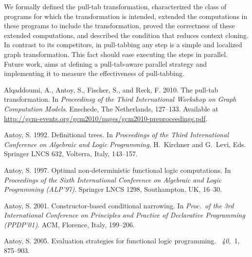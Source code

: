 \documentclass{mytlp}
\begin{document}
We formally defined the pull-tab transformation,
characterized the class of programs for which the transformation
is intended, extended the computations in these programs
to include the transformation, proved the correctness
of these extended computations, and described the condition
that reduces context cloning.
In contrast to its competitors, in pull-tabbing any step is a
simple and localized graph transformation.
This fact should ease executing the steps in parallel.
Future work, aims at defining a pull-tab-aware parallel strategy
and implementing it to measure the effectiveness of pull-tabbing.


\newpage



\begin{thebibliography}{}

{\sc Alqaddoumi, A.}, {\sc Antoy, S.}, {\sc Fischer, S.}, {\sc and} {\sc Reck,
  F.} 2010.
\newblock The pull-tab transformation.
\newblock In {\em Proceedinsg of the Third International Workshop on Graph
  Computation Models}. Enschede, The Netherlands, 127--133.
\newblock Available at
  \url{http://gcm-events.org/gcm2010/pages/gcm2010-preproceedings.pdf}.

{\sc Antoy, S.} 1992.
\newblock Definitional trees.
\newblock In {\em Proceedings of the Third International Conference on
  Algebraic and Logic Programming}, {H.~Kirchner} {and} {G.~Levi}, Eds.
  Springer LNCS 632, Volterra, Italy, 143--157.

{\sc Antoy, S.} 1997.
\newblock Optimal non-deterministic functional logic computations.
\newblock In {\em Proceedings of the Sixth International Conference on
  Algebraic and Logic Programming (ALP'97)}. Springer LNCS 1298, Southampton,
  UK, 16--30.

{\sc Antoy, S.} 2001.
\newblock Constructor-based conditional narrowing.
\newblock In {\em Proc.\ of the 3rd International Conference on Principles and
  Practice of Declarative Programming (PPDP'01)}. ACM, Florence, Italy,
  199--206.

{\sc Antoy, S.} 2005.
\newblock Evaluation strategies for functional logic programming.
~{\em 40,\/}~1, 875--903.


\end{thebibliography}
\end{document}
